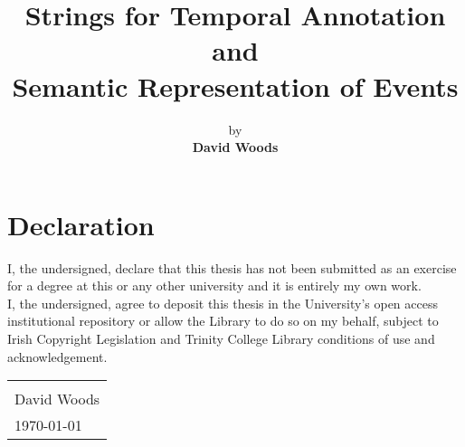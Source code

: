 \documentclass[a4paper,12pt,leqno]{article}
\title{\textbf{Strings for Temporal Annotation and\\Semantic Representation of Events}}
\author{by\\{\textbf{David Woods}}\bigskip\bigskip}
\date{\parbox{\linewidth}{\centering%
		{\large A dissertation submitted\\in fulfillment of the requirements\\for the Degree of\\\textbf{Doctor of Philosophy}}\\		
		\bigskip\bigskip\bigskip
		{\Large \textbf{University of Dublin, Trinity College}}\\\endgraf \monthyeardate\today}{\small \vspace{\fill} Supervised by: Dr Tim Fernando, Dr Carl Vogel}}
\begin{document}
\maketitle
\thispagestyle{empty}

\newpage
{}
\section*{Declaration}
\noindent
I, the undersigned, declare that this thesis has not been submitted as an exercise for a degree at this or any other university and it is entirely my own work.\\

\noindent
I, the undersigned, agree to deposit this thesis in the University's open access institutional repository or allow the Library to do so on my behalf, subject to Irish Copyright Legislation and Trinity College Library conditions of use and acknowledgement.


\vspace{\fill}

\begin{table*}[!htbp]
	\flushright
	\begin{tabular}{l}
		\makebox[10cm]{\hrulefill}\\[0.5cm]
		David Woods\\[0.25cm]
		{\monthyeardate\today}
	\end{tabular}
\end{table*}

\vspace{5em}

\newpage
\begin{abstract}
\noindent
\end{abstract}
\end{document}
